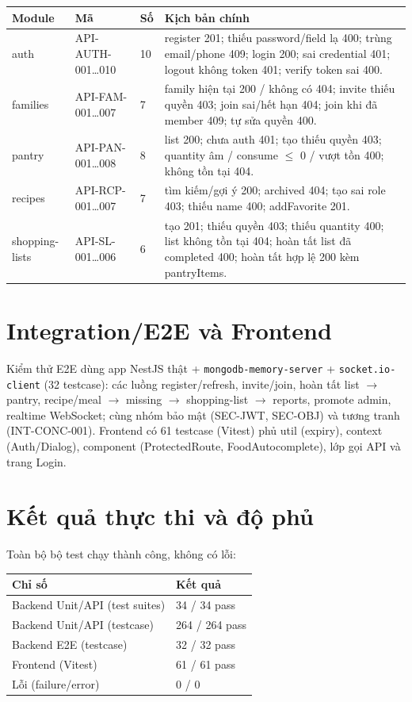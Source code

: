 \begingroup
\renewcommand{\arraystretch}{1.5}
\begin{longtable}{|p{2.5cm}|p{3.2cm}|p{1.3cm}|p{6cm}|}
\hline
\cellcolor[HTML]{D5F5E3}\textbf{Module} & \cellcolor[HTML]{D5F5E3}\textbf{Mã} & \cellcolor[HTML]{D5F5E3}\textbf{Số} & \cellcolor[HTML]{D5F5E3}\textbf{Kịch bản chính} \\ \hline
auth & API-AUTH-001…010 & 10 & register 201; thiếu password/field lạ 400; trùng email/phone 409; login 200; sai credential 401; logout không token 401; verify token sai 400. \\ \hline
families & API-FAM-001…007 & 7 & family hiện tại 200 / không có 404; invite thiếu quyền 403; join sai/hết hạn 404; join khi đã member 409; tự sửa quyền 400. \\ \hline
pantry & API-PAN-001…008 & 8 & list 200; chưa auth 401; tạo thiếu quyền 403; quantity âm / consume $\leq$ 0 / vượt tồn 400; không tồn tại 404. \\ \hline
recipes & API-RCP-001…007 & 7 & tìm kiếm/gợi ý 200; archived 404; tạo sai role 403; thiếu name 400; addFavorite 201. \\ \hline
shopping-lists & API-SL-001…006 & 6 & tạo 201; thiếu quyền 403; thiếu quantity 400; list không tồn tại 404; hoàn tất list đã completed 400; hoàn tất hợp lệ 200 kèm pantryItems. \\ \hline
\end{longtable}
\endgroup

\section{Integration/E2E và Frontend}
Kiểm thử E2E dùng app NestJS thật + \texttt{mongodb-memory-server} + \texttt{socket.io-client} (32 testcase): các luồng register/refresh, invite/join, hoàn tất list $\rightarrow$ pantry, recipe/meal $\rightarrow$ missing $\rightarrow$ shopping-list $\rightarrow$ reports, promote admin, realtime WebSocket; cùng nhóm bảo mật (SEC-JWT, SEC-OBJ) và tương tranh (INT-CONC-001). Frontend có 61 testcase (Vitest) phủ util (expiry), context (Auth/Dialog), component (ProtectedRoute, FoodAutocomplete), lớp gọi API và trang Login.

\section{Kết quả thực thi và độ phủ}
Toàn bộ bộ test chạy thành công, không có lỗi:

\begingroup
\renewcommand{\arraystretch}{1.5}
\begin{longtable}{|p{6cm}|p{4cm}|}
\hline
\cellcolor[HTML]{D5F5E3}\textbf{Chỉ số} & \cellcolor[HTML]{D5F5E3}\textbf{Kết quả} \\ \hline
Backend Unit/API (test suites) & 34 / 34 pass \\ \hline
Backend Unit/API (testcase) & 264 / 264 pass \\ \hline
Backend E2E (testcase) & 32 / 32 pass \\ \hline
Frontend (Vitest) & 61 / 61 pass \\ \hline
Lỗi (failure/error) & 0 / 0 \\ \hline
\end{longtable}
\endgroup

